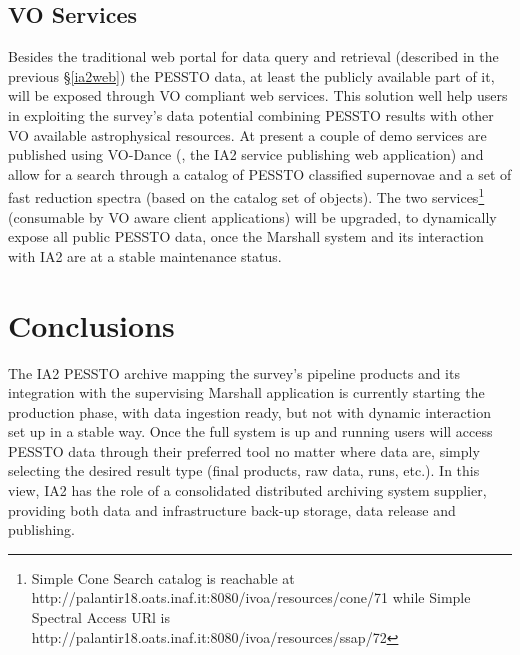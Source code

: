 \subsection{VO Services}\label{vo}
Besides the traditional web portal for data query and retrieval (described in the previous \S \ref{ia2web}) the PESSTO data, at least the publicly available part of it, will be exposed through VO compliant web services. This solution well help users in exploiting the survey's data potential combining PESSTO results with other VO available astrophysical resources. At present a couple of demo services are published using VO-Dance (\cite{molinaro_spie12}, the IA2 service publishing web application) and allow for a search through a catalog of PESSTO classified supernovae and a set of fast reduction spectra (based on the catalog set of objects). The two services\footnote{Simple Cone Search catalog is reachable at http://palantir18.oats.inaf.it:8080/ivoa/resources/cone/71 while Simple Spectral Access URl is http://palantir18.oats.inaf.it:8080/ivoa/resources/ssap/72} (consumable by VO aware client applications) will be upgraded, to dynamically expose all public PESSTO data, once the Marshall system and its interaction with IA2 are at a stable maintenance status.

\section{Conclusions}

The IA2 PESSTO archive mapping the survey's pipeline products and its integration with the supervising Marshall application is currently starting the production phase, with data ingestion ready, but not with dynamic interaction set up in a stable way. Once the full system is up and running users will access PESSTO data through their preferred tool no matter where data are, simply selecting the desired result type (final products, raw data, runs, etc.). In this view, IA2 has the role of a consolidated distributed archiving system supplier, providing both data and infrastructure back-up storage, data release and publishing.

